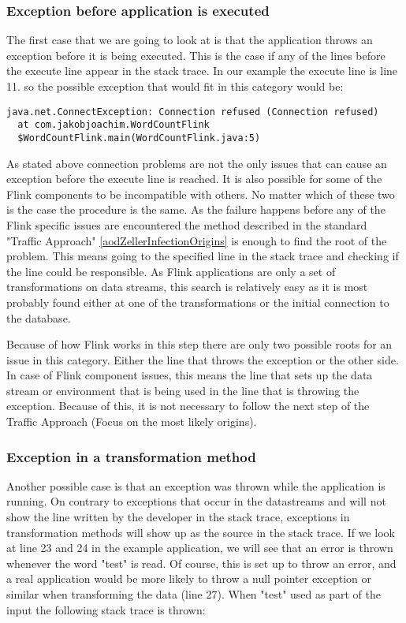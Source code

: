 \subsubsection{Exception before application is executed}
The first case that we are going to look at is that the application throws an exception before it is being executed. This is the case if any of the lines before the execute line appear in the stack trace. In our example the execute line is line 11. so the possible exception that would fit in this category would be:

\begin{lstlisting}[caption={Connection Exception}]
java.net.ConnectException: Connection refused (Connection refused)
  at com.jakobjoachim.WordCountFlink
  $WordCountFlink.main(WordCountFlink.java:5)
\end{lstlisting}

As stated above connection problems are not the only issues that can cause an exception before the execute line is reached. It is also possible for some of the Flink components to be incompatible with others. No matter which of these two is the case the procedure is the same. As the failure happens before any of the Flink specific issues are encountered the method described in the standard "Traffic Approach" \ref{aodZellerInfectionOrigins} is enough to find the root of the problem. This means going to the specified line in the stack trace and checking if the line could be responsible. As Flink applications are only a set of transformations on data streams, this search is relatively easy as it is most probably found either at one of the transformations or the initial connection to the database.

Because of how Flink works in this step there are only two possible roots for an issue in this category. Either the line that throws the exception or the other side. In case of Flink component issues, this means the line that sets up the data stream or environment that is being used in the line that is throwing the exception. Because of this, it is not necessary to follow the next step of the Traffic Approach (Focus on the most likely origins).

\subsubsection{Exception in a transformation method}
Another possible case is that an exception was thrown while the application is running. On contrary to exceptions that occur in the datastreams and will not show the line written by the developer in the stack trace, exceptions in transformation methods will show up as the source in the stack trace. If we look at line 23 and 24 in the example application, we will see that an error is thrown whenever the word "test" is read. Of course, this is set up to throw an error, and a real application would be more likely to throw a null pointer exception or similar when transforming the data (line 27). When "test" used as part of the input the following stack trace is thrown:

